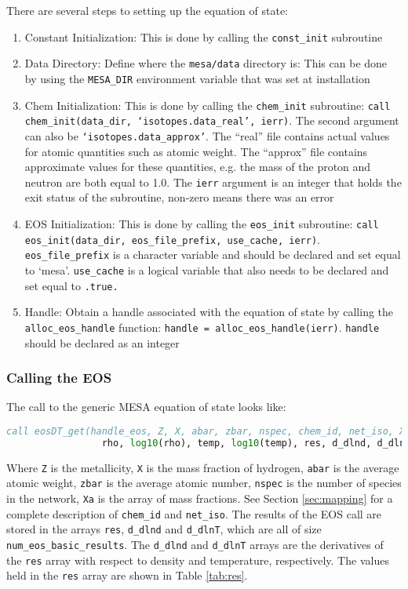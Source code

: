 There are several steps to setting up the equation of state:
\begin{enumerate}
\item Constant Initialization: This is done by calling the {\tt const\_init} 
subroutine

\item Data Directory: Define where the {\tt mesa/data} directory is: This can 
be done by using the {\tt MESA\_DIR} environment variable that was set 
at installation

\item Chem Initialization: This is done by calling the {\tt chem\_init} 
subroutine: {\tt call chem\_init(data\_dir, `isotopes.data\_real', ierr)}. 
The second argument can also be {\tt `isotopes.data\_approx'}. The ``real'' 
file contains actual values for 
atomic quantities such as atomic weight. The ``approx'' file contains 
approximate values for these quantities, e.g. the mass of the proton and 
neutron are both equal to 1.0. The {\tt ierr} argument is an integer that 
holds the exit status of the subroutine, non-zero means there was an error

\item EOS Initialization: This is done by calling the {\tt eos\_init} 
subroutine: {\tt call eos\_init(data\_dir, eos\_file\_prefix, use\_cache, 
ierr)}. {\tt eos\_file\_prefix} is a character variable and should be 
declared and set equal to `mesa'. {\tt use\_cache} is a logical variable that 
also needs to be declared and set equal to {\tt .true.}

\item Handle: Obtain a handle associated with the equation of state by 
calling the {\tt alloc\_eos\_handle} function: 
{\tt handle = alloc\_eos\_handle(ierr)}. {\tt handle} should be declared as an 
integer
\end{enumerate}

\subsubsection{Calling the EOS}

The call to the generic {\sf MESA} equation of state looks like:
\begin{lstlisting}[language=fortran,mathescape=false]
  call eosDT_get(handle_eos, Z, X, abar, zbar, nspec, chem_id, net_iso, Xa, &
                 rho, log10(rho), temp, log10(temp), res, d_dlnd, d_dlnT, ierr)
\end{lstlisting}
Where {\tt Z} is the metallicity, {\tt X} is the mass fraction of hydrogen, 
{\tt abar} is the average atomic weight, {\tt zbar} is the average atomic 
number, {\tt nspec} is the number of species in the network, {\tt Xa} is 
the array of mass fractions. See Section \ref{sec:mapping} for a complete 
description of {\tt chem\_id} and {\tt net\_iso}. The results of the EOS call 
are stored in the arrays {\tt res}, {\tt d\_dlnd} and {\tt d\_dlnT}, which 
are all of size {\tt num\_eos\_basic\_results}. The {\tt d\_dlnd} and 
{\tt d\_dlnT} arrays are the derivatives of the {\tt res} array with respect 
to density and temperature, respectively. The values held in the {\tt res} 
array are shown in Table \ref{tab:res}.

